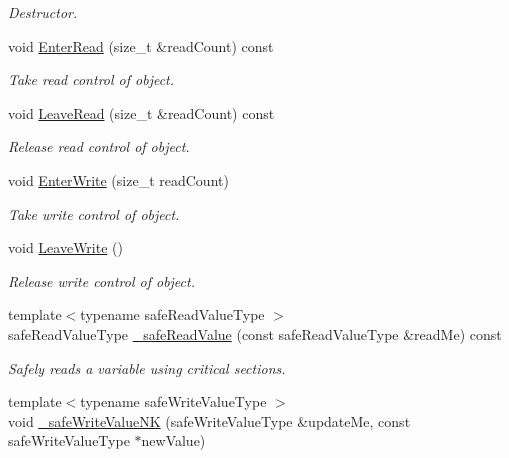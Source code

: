 \begin{DoxyCompactItemize}
\begin{DoxyCompactList}\small\item\em Destructor. \item\end{DoxyCompactList}\item 
void \hyperlink{class_concurrency_control_simple_a78ef938728e79eb989dc0e3fcc666508}{EnterRead} (size\_\-t \&readCount) const 
\begin{DoxyCompactList}\small\item\em Take read control of object. \item\end{DoxyCompactList}\item 
void \hyperlink{class_concurrency_control_simple_a534f054cf5af2f25709872c3e2fab00a}{LeaveRead} (size\_\-t \&readCount) const 
\begin{DoxyCompactList}\small\item\em Release read control of object. \item\end{DoxyCompactList}\item 
void \hyperlink{class_concurrency_control_simple_aa25904f2d9f563ef371d774dfb9b2082}{EnterWrite} (size\_\-t readCount)
\begin{DoxyCompactList}\small\item\em Take write control of object. \item\end{DoxyCompactList}\item 
void \hyperlink{class_concurrency_control_simple_afb64468163c99624de72611a1fff4846}{LeaveWrite} ()
\begin{DoxyCompactList}\small\item\em Release write control of object. \item\end{DoxyCompactList}\item 
{\footnotesize template$<$typename safeReadValueType $>$ }\\safeReadValueType \hyperlink{class_concurrency_control_simple_a1c346ff35d22a75bf37106dbd380481a}{\_\-safeReadValue} (const safeReadValueType \&readMe) const 
\begin{DoxyCompactList}\small\item\em Safely reads a variable using critical sections. \item\end{DoxyCompactList}\item 
{\footnotesize template$<$typename safeWriteValueType $>$ }\\void \hyperlink{class_concurrency_control_simple_a438f34a957e53795f1d3bf8a229ddd43}{\_\-safeWriteValueNK} (safeWriteValueType \&updateMe, const safeWriteValueType $\ast$newValue)

\end{DoxyCompactItemize}

